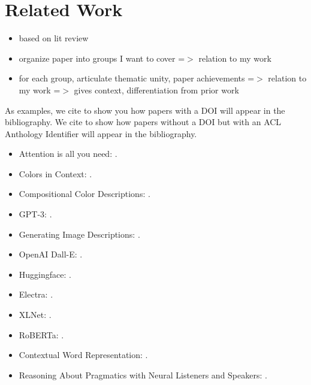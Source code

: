 \section{Related Work}

\begin{itemize}
  \item based on lit review
  \item organize paper into groups I want to cover =$>$ relation to my work
  \item for each group, articulate thematic unity, paper achievements =$>$ relation to my work =$>$ gives context, differentiation from prior work
\end{itemize}

As examples, we cite \citep{vaswani-2017-attention} to show you how papers with a DOI will appear in the bibliography.
We cite \citep{monroe-2017-colors} to show how papers without a DOI but with an ACL Anthology Identifier will appear in the bibliography.

\begin{itemize}
  \item Attention is all you need: \citep{vaswani-2017-attention}.
  \item Colors in Context: \citep{monroe-2017-colors}.
  \item Compositional Color Descriptions: \citep{monroe-2016-compositional}.
  \item GPT-3: \citep{brown-2020-gpt3}.
  \item Generating Image Descriptions: \citep{karpathy-2014-image_descriptions}.
  \item OpenAI Dall-E: \citep{openai-2020-dalle}.
  \item Huggingface: \citep{wolf-2019-huggingface}.
  \item Electra: \citep{clark-2020-electra}.
  \item XLNet: \citep{yang-2019-xlnet}.
  \item RoBERTa: \citep{liu-2019-roberta}.
  \item Contextual Word Representation: \citep{smith-2019-contextual}.
  \item Reasoning About Pragmatics with Neural Listeners and Speakers: \citep{andreas-2016-reasoning}.
\end{itemize}
